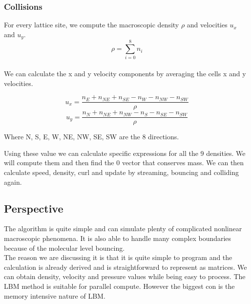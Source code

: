 \documentclass[12pt]{article}
\begin{document}
\subsubsection{Collisions}
For every lattice site, we compute the macroscopic density $\rho$ and velocities $ u_x$ and $u_y$.
\begin{equation}
    \rho = \sum_{i=0}^{8} n_i
\end{equation} \\

We can calculate the x and y velocity components by averaging the cells x and y velocities.

\begin{equation}
    u_x = \frac{n_E + n_{NE} + n_{SE} - n_{W} - n_{NW} - n_{SW} }{\rho}
\end{equation}
\begin{equation}
    u_y = \frac{n_N + n_{NE} + n_{NW} - n_S - n_{SE} - n_{SW}}{\rho}
\end{equation}

Where N, S, E, W, NE, NW, SE, SW are the 8 directions.

Using these value we can calculate specific expressions for all the 9 densities. We will compute them and then find the $0$ vector that conserves mass. We can then calculate speed, density, curl and update by streaming, bouncing and colliding again.
\subsection{Perspective}
The algorithm is quite simple and can simulate plenty of complicated nonlinear macroscopic phenomena. It is also able to handle many complex boundaries because of the molecular level bouncing. \\

The reason we are discussing it is that it is quite simple to program and the calculation is already derived and is straightforward to represent as matrices. We can obtain density, velocity and pressure values while being easy to process. The LBM method is suitable for parallel compute. However the biggest con is the memory intensive nature of LBM.
\end{document}
